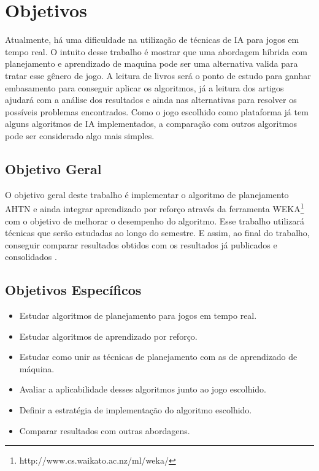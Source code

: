 \chapter{\label{chap:obje}Objetivos}

Atualmente, há uma dificuldade na utilização de técnicas de IA para jogos em tempo real.
O intuito desse trabalho é mostrar que uma abordagem híbrida com planejamento e aprendizado de maquina pode ser uma alternativa valida para tratar esse gênero de jogo. 
A leitura de livros será o ponto de estudo para ganhar embasamento para conseguir aplicar os algoritmos, já a leitura dos artigos ajudará com a análise dos resultados e ainda nas alternativas para resolver os possíveis problemas encontrados. 
Como o jogo escolhido como plataforma já tem alguns algoritmos de IA implementados, a comparação com outros algoritmos pode ser considerado algo mais simples.  

\section{Objetivo Geral}

O objetivo geral deste trabalho é implementar o algoritmo de planejamento AHTN \cite{ontanon2015adversarial} e ainda integrar aprendizado por reforço através da ferramenta WEKA\footnote{http://www.cs.waikato.ac.nz/ml/weka/} com o objetivo de melhorar o desempenho do algoritmo. Esse trabalho utilizará técnicas que serão estudadas ao longo do semestre. 
E assim, ao final do trabalho, conseguir comparar resultados obtidos com os resultados já publicados e consolidados \cite{ontanon2007case,ontanon2012experiments,hogg2010learning,buro2003real,ontanon2013survey}.  

\section{Objetivos Específicos}
\label{obj:esp}
\begin{itemize}
\item Estudar algoritmos de planejamento para jogos em tempo real.
\item Estudar algoritmos de aprendizado por reforço.
\item Estudar como unir as técnicas de planejamento com as de aprendizado de máquina.
\item Avaliar a aplicabilidade desses algoritmos junto ao jogo escolhido.
\item Definir a estratégia de implementação do algoritmo escolhido.
\item Comparar resultados com outras abordagens.
\end{itemize}

